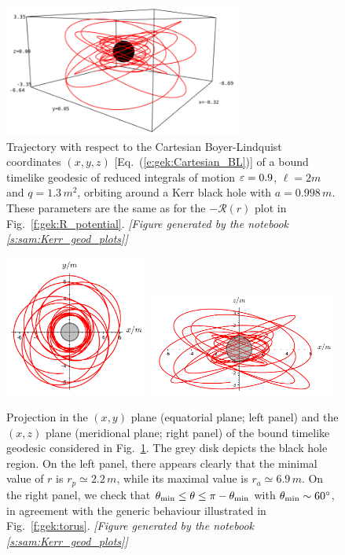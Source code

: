 \begin{figure}
\centerline{\includegraphics[width=0.7\textwidth]{gek_timelike_xyz.png}}
\caption[]{\label{f:gek:timelike_xyz} \footnotesize
Trajectory with respect to the Cartesian Boyer-Lindquist coordinates
$(x,y,z)$ [Eq.~(\ref{e:gek:Cartesian_BL})]
of a bound timelike geodesic of reduced integrals of motion
$\varepsilon=0.9$, $\ell=2 m$ and $q=1.3\, m^2$, orbiting around a
Kerr black hole with $a=0.998\, m$. These parameters are the same as for
the $-\mathcal{R}(r)$ plot in Fig.~\ref{f:gek:R_potential}.
\textsl{[Figure generated by the notebook \ref{s:sam:Kerr_geod_plots}]}
}
\end{figure}

\begin{figure}
\centerline{\includegraphics[width=0.42\textwidth]{gek_timelike_xy.pdf}\
\includegraphics[width=0.55\textwidth]{gek_timelike_xz.pdf}
}
\caption[]{\label{f:gek:timelike_plane} \footnotesize
Projection in the $(x,y)$ plane (equatorial plane; left panel) and the $(x,z)$ plane
(meridional plane; right panel)
of the bound timelike geodesic considered in Fig.~\ref{f:gek:timelike_xyz}.
The grey disk depicts the black hole region. On the left panel, there appears
clearly that the minimal value of $r$ is $r_p \simeq 2.2\, m$, while its
maximal value is $r_a \simeq 6.9\, m$. On the right panel, we check
that $\theta_{\rm min} \leq \theta \leq \pi -\theta_{\rm min}$ with
$\theta_{\rm min} \sim 60^\circ$, in agreement with the generic behaviour
illustrated in Fig.~\ref{f:gek:torus}.
\textsl{[Figure generated by the notebook \ref{s:sam:Kerr_geod_plots}]}
}
\end{figure}

